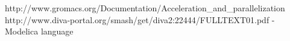 http://www.gromacs.org/Documentation/Acceleration_and_parallelization
http://www.diva-portal.org/smash/get/diva2:22444/FULLTEXT01.pdf - Modelica language